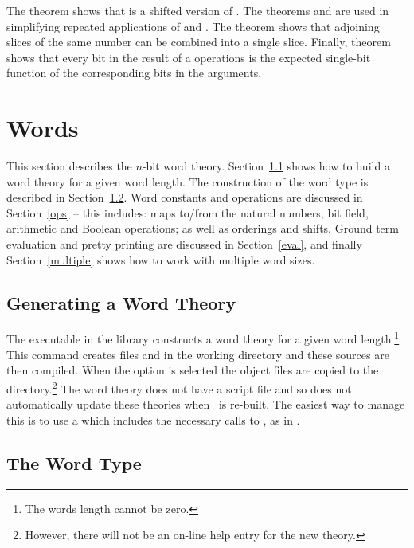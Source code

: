 \noindent The theorem  shows that  is a shifted version of .  The theorems  and  are used in simplifying repeated applications of  and .  The theorem  shows that adjoining slices of the same number can be combined into a single slice.  Finally, theorem  shows that every bit in the result of a  operations is the expected single-bit function of the corresponding bits in the arguments.

\section{Words}

This section describes the $n$-bit word theory.  Section~\ref{mkword} shows how to build a word theory for a given word length.  The construction of the word type is described in Section~\ref{type}.  Word constants and operations are discussed in Section~\ref{ops} -- this includes: maps to/from the natural numbers; bit field, arithmetic and Boolean operations; as well as orderings and shifts.
Ground term evaluation and pretty printing are discussed in Section~\ref{eval}, and finally Section~\ref{multiple} shows how to work with multiple word sizes.

\subsection{Generating a Word Theory} \label{mkword}

The executable  in the  library constructs a word theory for a given word length.\footnote{The words length cannot be zero.}  This command creates files  and  in the working directory and these sources are then compiled. When the  option is selected the object files are copied to the  directory.\footnote{
However, there will not be an on-line help entry for the new theory.}
The word theory does not have a script file and so  does not automatically update these theories \eg{} when \HOL\ is re-built.  The easiest way to manage this is to use a  which includes the necessary calls to , as in .

\subsection{The Word Type} \label{type}

